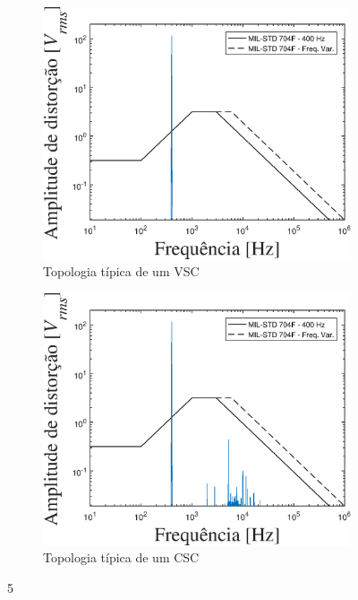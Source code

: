 \begin{figure}[!htb] %
	\centering
	\begin{subfigure}[b]{0.48\textwidth}
		\centering
		\includegraphics[width=\textwidth]{Cap4/Figuras/resultados_unfilt_5.eps}
		\caption{Topologia típica de um VSC} 
		\label{fig:resultados_unfilt_5.eps}
	\end{subfigure}%
		\hfill
	\begin{subfigure}[b]{0.48\textwidth}  
		\centering 
		\includegraphics[width=\textwidth]{Cap4/Figuras/resultados_filt_5.eps}
		\caption{Topologia típica de um CSC}    
		\label{fig:resultados_filt_5.eps}
	\end{subfigure}%
	\caption{5}
	\label{fig:5}
\end{figure}

